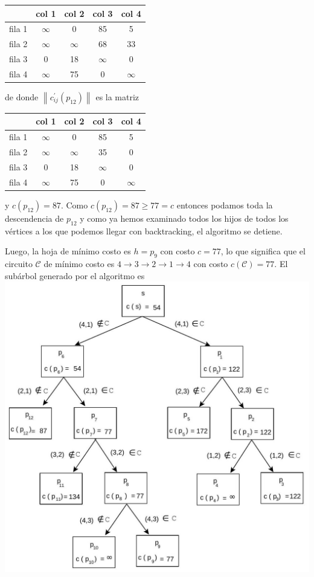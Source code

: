 \documentclass[10pt]{article}
\begin{document}
\begin{center}
\begin{tabular}{|l|c|c|c|c|}
\hline
 & col 1 & col 2 & col 3 & col 4 \\
\hline
fila 1 & $\infty$ & 0 & 85 & 5 \\
\hline
fila 2 & $\infty$ & $\infty$ & 68 & 33 \\
\hline
fila 3 & 0 & 18 & $\infty$ & 0 \\
\hline
fila 4 & $\infty$ & 75 & 0 & $\infty$ \\
\hline
\end{tabular}
\end{center}

de donde $\left\|c_{i j}^{\prime}\left(p_{12}\right)\right\|$ es la matriz

\begin{center}
\begin{tabular}{|l|c|c|c|c|}
\hline
 & col 1 & col 2 & col 3 & col 4 \\
\hline
fila 1 & $\infty$ & 0 & 85 & 5 \\
\hline
fila 2 & $\infty$ & $\infty$ & 35 & 0 \\
\hline
fila 3 & 0 & 18 & $\infty$ & 0 \\
\hline
fila 4 & $\infty$ & 75 & 0 & $\infty$ \\
\hline
\end{tabular}
\end{center}

y $c\left(p_{12}\right)=87$. Como $c\left(p_{12}\right)=87 \geq 77=c$ entonces podamos toda la descendencia de $p_{12}$ y como ya hemos examinado todos los hijos de todos los vértices a los que podemos llegar con backtracking, el algoritmo se detiene.

Luego, la hoja de mínimo costo es $h=p_{9}$ con costo $c=77$, lo que significa que el circuito $\mathcal{C}$ de mínimo costo es $4 \longrightarrow 3 \longrightarrow 2 \longrightarrow 1 \longrightarrow 4$ con costo $c(\mathcal{C})=77$. El subárbol generado por el algoritmo es\\
\includegraphics[max width=\textwidth, center]{2025_09_05_458e5b1ce89abceb5d44g-35}
\end{document}
